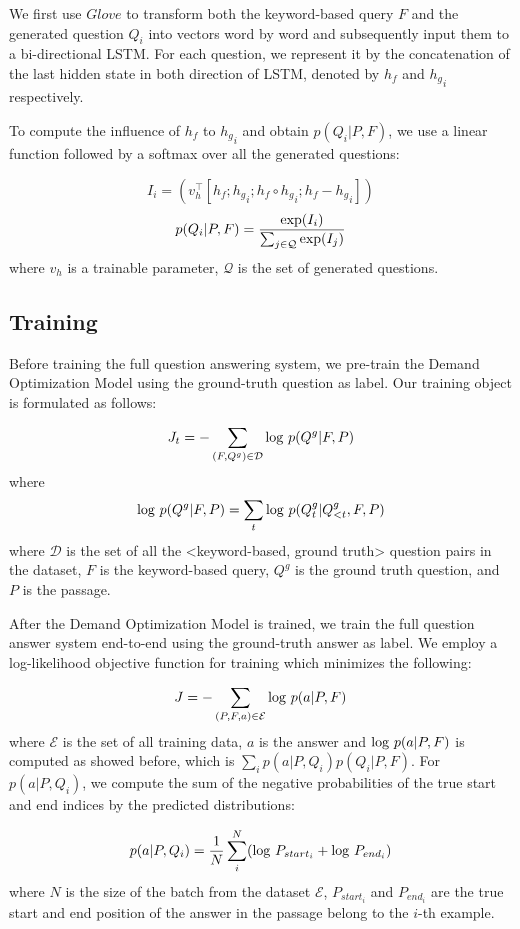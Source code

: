\documentclass[sigconf]{acmart}
\begin{document}
We first use $Glove$ to transform both the keyword-based query $F$ and the generated question $Q_i$ into vectors word by word and subsequently input them to a bi-directional LSTM. For each question, we represent it by the concatenation of the last hidden state in both direction of LSTM, denoted by $h_f$ and ${h_g}_i$ respectively. 

To compute the influence of $h_f$ to ${h_g}_i$ and obtain $p(Q_i | P, F)$, we use a linear function followed by a softmax over all the generated questions:

$$I_i = (v_h^{\top}[h_f; {h_g}_i; h_f \circ {h_g}_i; h_f - {h_g}_i])$$
$$p(Q_i | P, F) = \frac{{\rm exp}(I_i)}{\sum_{j \in \mathcal{Q}} {\rm exp}(I_j)}$$
where $v_h$ is a trainable parameter, $\mathcal{Q}$ is the set of generated questions.

\subsection{Training}
Before training the full question answering system, we pre-train the Demand Optimization Model using the ground-truth question as label. Our training object is formulated as follows:

$$J_{t} = -\sum_{(F,Q^g) \in \mathcal{D}}{\rm log}~p(Q^g|F,P)$$
where 
$${\rm log} ~p(Q^g|F,P) =  \sum_{t} {\rm log}~p(Q^g_t | Q^g_{<t},F,P)$$
where $\mathcal{D}$ is the set of all the <keyword-based, ground truth> question pairs in the dataset, $F$ is the keyword-based query, $Q^g$ is the ground truth question, and $P$ is the passage.

After the Demand Optimization Model is trained, we train the full question answer system end-to-end using the ground-truth answer as label. We employ a log-likelihood objective function for training which minimizes the following:

$$J = -\sum_{(P,F,a) \in \mathcal{E}}{\rm log} ~p(a|P,F)$$
where $\mathcal{E}$ is the set of all training data, $a$ is the answer and ${\rm log} ~p(a|P,F)$ is computed as showed before, which is $\sum_{i}p(a|P,Q_i)p(Q_i | P, F)$. For $p(a|P,Q_i)$, we compute the sum of the negative probabilities of the true start and end indices by the predicted distributions:

$$p(a|P,Q_i) = \frac{1}{N} \sum_{i}^{N}({\rm log}~P_{start_{i}} + {\rm log}~P_{end_{i}})$$
where $N$ is the size of the batch from the dataset $\mathcal{E}$, $P_{start_{i}}$ and $P_{end_{i}}$ are the true start and end position of the answer in the passage belong to the $i$-th example.
\end{document}
